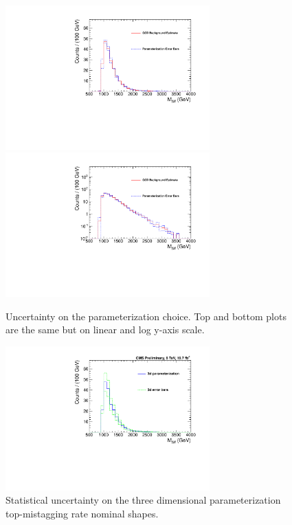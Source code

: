 \begin{figure}[htcb]
\begin{center}
\includegraphics[width=0.7\textwidth]{AN-14-049/figs/Mtw2dvs1dBE}\\
\includegraphics[width=0.7\textwidth]{AN-14-049/figs/Mtw2dvs1dBEsemilog}
\caption{
Uncertainty on the parameterization choice. Top and bottom plots are the same but on linear and log y-axis scale.
}
\label{figs:bsPARAMERROR}
\end{center}
\end{figure}

\begin{figure}[htcb]
\begin{center}
\includegraphics[width=0.7\textwidth]{AN-14-049/figs/Mtw2dstatssubtracted.pdf}
\caption{
Statistical uncertainty on the three dimensional parameterization top-mistagging rate nominal shapes.
}
\label{figs:bsPARAMERRORstat}
\end{center}
\end{figure}



